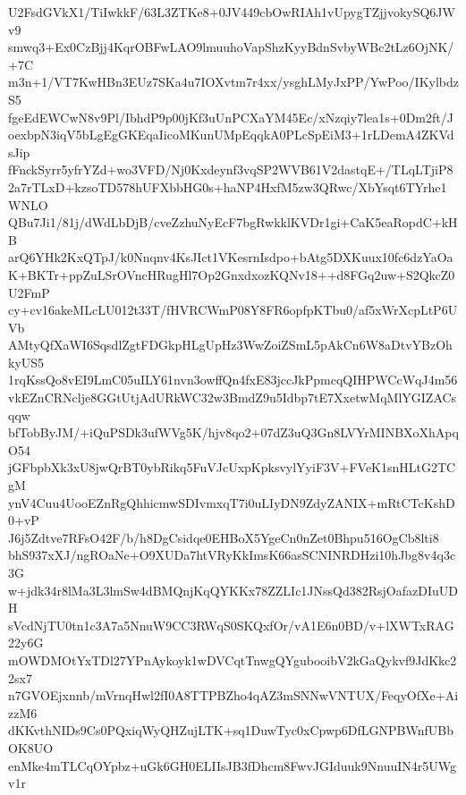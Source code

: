 U2FsdGVkX1/TiIwkkF/63L3ZTKe8+0JV449cbOwRIAh1vUpygTZjjvokySQ6JWv9
smwq3+Ex0CzBjj4KqrOBFwLAO9lmuuhoVapShzKyyBdnSvbyWBc2tLz6OjNK/+7C
m3n+1/VT7KwHBn3EUz7SKa4u7IOXvtm7r4xx/ysghLMyJxPP/YwPoo/IKylbdzS5
fgeEdEWCwN8v9Pl/IbhdP9p00jKf3uUnPCXaYM45Ec/xNzqiy7lea1s+0Dm2ft/J
oexbpN3iqV5bLgEgGKEqaIicoMKunUMpEqqkA0PLcSpEiM3+1rLDemA4ZKVdsJip
fFnckSyrr5yfrYZd+wo3VFD/Nj0Kxdeynf3vqSP2WVB61V2dastqE+/TLqLTjiP8
2a7rTLxD+kzsoTD578hUFXbbHG0s+haNP4HxfM5zw3QRwc/XbYsqt6TYrhe1WNLO
QBu7Ji1/81j/dWdLbDjB/cveZzhuNyEcF7bgRwkklKVDr1gi+CaK5eaRopdC+kHB
arQ6YHk2KxQTpJ/k0Nnqnv4KsJIct1VKesrnIsdpo+bAtg5DXKuux10fc6dzYaOa
K+BKTr+ppZuLSrOVncHRugHl7Op2GnxdxozKQNv18++d8FGq2uw+S2QkcZ0U2FmP
cy+cv16akeMLcLU012t33T/fHVRCWmP08Y8FR6opfpKTbu0/af5xWrXcpLtP6UVb
AMtyQfXaWI6SqsdlZgtFDGkpHLgUpHz3WwZoiZSmL5pAkCn6W8aDtvYBzOhkyUS5
1rqKssQo8vEI9LmC05uILY61nvn3owffQn4fxE83jccJkPpmcqQIHPWCcWqJ4m56
vkEZnCRNclje8GGtUtjAdURkWC32w3BmdZ9u5Idbp7tE7XxetwMqMlYGIZACsqqw
bfTobByJM/+iQuPSDk3ufWVg5K/hjv8qo2+07dZ3uQ3Gn8LVYrMINBXoXhApqO54
jGFbpbXk3xU8jwQrBT0ybRikq5FuVJcUxpKpksvylYyiF3V+FVeK1snHLtG2TCgM
ynV4Cuu4UooEZnRgQhhicmwSDIvmxqT7i0uLIyDN9ZdyZANIX+mRtCTcKshD0+vP
J6j5Zdtve7RFsO42F/b/h8DgCsidqe0EHBoX5YgeCn0nZet0Bhpu516OgCb8lti8
bhS937xXJ/ngROaNe+O9XUDa7htVRyKkImsK66asSCNINRDHzi10hJbg8v4q3c3G
w+jdk34r8lMa3L3lmSw4dBMQnjKqQYKKx78ZZLIc1JNssQd382RsjOafazDIuUDH
sVcdNjTU0tn1c3A7a5NnuW9CC3RWqS0SKQxfOr/vA1E6n0BD/v+lXWTxRAG22y6G
mOWDMOtYxTDl27YPnAykoyk1wDVCqtTnwgQYgubooibV2kGaQykvf9JdKkc22sx7
n7GVOEjxnnb/mVrnqHwl2fI0A8TTPBZho4qAZ3mSNNwVNTUX/FeqyOfXe+AizzM6
dKKvthNIDs9Cs0PQxiqWyQHZujLTK+sq1DuwTyc0xCpwp6DfLGNPBWnfUBbOK8UO
enMke4mTLCqOYpbz+uGk6GH0ELIIsJB3fDhcm8FwvJGIduuk9NnuuIN4r5UWgv1r
